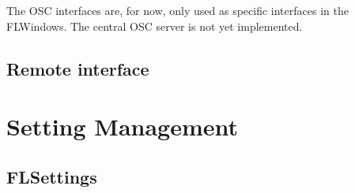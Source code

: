 \documentclass[a4paper]{article}
\begin{document}
The OSC interfaces are, for now, only used as specific interfaces in the FLWindows. The central OSC server is not yet implemented. 

\subsection{Remote interface}

\section{Setting Management}

\subsection{FLSettings \label{FLSettings}}
\end{document}
